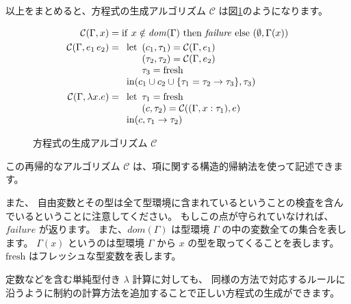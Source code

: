 以上をまとめると、方程式の生成アルゴリズム $\mathcal C$ は図\ref{fig:algorithm-c}のようになります。

\begin{figure}[htbp]
  \begin{align*}
    \mathcal{C}(\Gamma, x) &=
      \mathrm{if} ~ x \notin \mathit{dom}(\Gamma) ~
      \mathrm{then} ~ \mathit{failure} ~
      \mathrm{else} ~ (\emptyset, \Gamma(x)) \\
    \mathcal{C}(\Gamma, e_1 \, e_2) &=
    \begin{array}[t]{l}
      \mathrm{let}
        \begin{array}[t]{l}
          (c_1, \tau_1) = \mathcal{C}(\Gamma, e_1) \\
          (\tau_2, \tau_2) = \mathcal{C}(\Gamma, e_2) \\
          \tau_3 = \mathrm{fresh}
        \end{array} \\
      \mathrm{in} (c_1 \cup c_2 \cup \{\tau_1 = \tau_2 \to \tau_3\}, \tau_3)
    \end{array} \\
    \mathcal{C}(\Gamma, \lambda x . e) &=
    \begin{array}[t]{l}
      \mathrm{let}
        \begin{array}[t]{l}
          \tau_1 = \mathrm{fresh} \\
          (c, \tau_2) = \mathcal{C}((\Gamma, x : \tau_1), e)
        \end{array} \\
      \mathrm{in} (c, \tau_1 \to \tau_2)
    \end{array}
  \end{align*}
  \caption{方程式の生成アルゴリズム $\mathcal C$}
  \label{fig:algorithm-c}
\end{figure}

この再帰的なアルゴリズム $\mathcal C$ は、項に関する構造的帰納法を使って記述できます。

また、
自由変数とその型は全て型環境に含まれているということの検査を含んでいるということに注意してください。
もしこの点が守られていなければ、$\mathit{failure}$ が返ります。
また、$\mathit{dom}(\Gamma)$ は型環境 $\Gamma$ の中の変数全ての集合を表します。
$\Gamma(x)$ というのは型環境 $\Gamma$ から $x$ の型を取ってくることを表します。
$\mathrm{fresh}$ はフレッシュな型変数を表します。

定数などを含む単純型付き $\lambda$ 計算に対しても、
同様の方法で対応するルールに沿うように制約の計算方法を追加することで正しい方程式の生成ができます。

